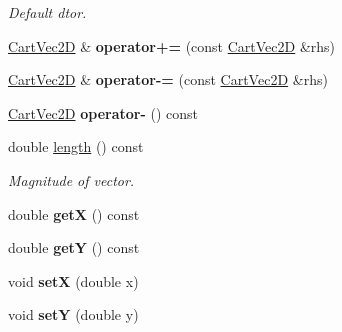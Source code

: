 \begin{DoxyCompactItemize}
\begin{DoxyCompactList}\small\item\em Default dtor. \end{DoxyCompactList}\item 
\hyperlink{class_cart_vec2_d}{Cart\+Vec2D} \& {\bfseries operator+=} (const \hyperlink{class_cart_vec2_d}{Cart\+Vec2D} \&rhs)\hypertarget{class_cart_vec2_d_a534f5059db6628f14d711b0f0f34945c}{}\label{class_cart_vec2_d_a534f5059db6628f14d711b0f0f34945c}

\item 
\hyperlink{class_cart_vec2_d}{Cart\+Vec2D} \& {\bfseries operator-\/=} (const \hyperlink{class_cart_vec2_d}{Cart\+Vec2D} \&rhs)\hypertarget{class_cart_vec2_d_a6cc6a41f907b69514a9689bca6d8dd53}{}\label{class_cart_vec2_d_a6cc6a41f907b69514a9689bca6d8dd53}

\item 
\hyperlink{class_cart_vec2_d}{Cart\+Vec2D} {\bfseries operator-\/} () const \hypertarget{class_cart_vec2_d_a5ec1f6b49f1c013302799d95f6c17d33}{}\label{class_cart_vec2_d_a5ec1f6b49f1c013302799d95f6c17d33}

\item 
double \hyperlink{class_cart_vec2_d_ac18820336e7e22bf909c9fefff307c9d}{length} () const \hypertarget{class_cart_vec2_d_ac18820336e7e22bf909c9fefff307c9d}{}\label{class_cart_vec2_d_ac18820336e7e22bf909c9fefff307c9d}

\begin{DoxyCompactList}\small\item\em Magnitude of vector. \end{DoxyCompactList}\item 
double {\bfseries getX} () const \hypertarget{class_cart_vec2_d_aafde5f075265409f2cbcd6f14bf5cbe1}{}\label{class_cart_vec2_d_aafde5f075265409f2cbcd6f14bf5cbe1}

\item 
double {\bfseries getY} () const \hypertarget{class_cart_vec2_d_a0ad31fa5e9398132c38e548189ca89a1}{}\label{class_cart_vec2_d_a0ad31fa5e9398132c38e548189ca89a1}

\item 
void {\bfseries setX} (double x)\hypertarget{class_cart_vec2_d_ab639eb35be2e12b043fd905a912d367a}{}\label{class_cart_vec2_d_ab639eb35be2e12b043fd905a912d367a}

\item 
void {\bfseries setY} (double y)\hypertarget{class_cart_vec2_d_ad9024978cb20db5e11e8be7d13b51055}{}\label{class_cart_vec2_d_ad9024978cb20db5e11e8be7d13b51055}

\end{DoxyCompactItemize}
